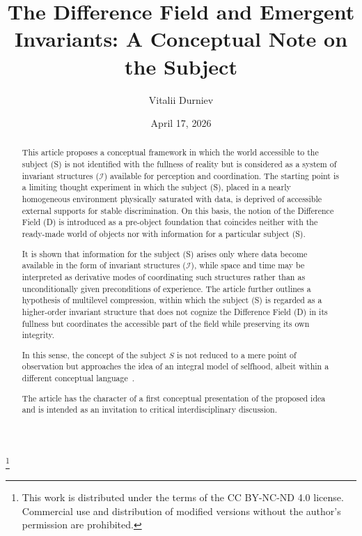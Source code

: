 \documentclass[aps,prd,onecolumn,nofootinbib,superscriptaddress]{revtex4-2} %
\newcommand{\papertitle}{The Difference Field and Emergent Invariants: A Conceptual Note on the Subject}
\newcommand{\paperauthor}{Vitalii Durniev}
\begin{document}
    \title{\papertitle}

    \thanks{This work is distributed under the terms of the CC BY-NC-ND 4.0 license. Commercial use and distribution of modified versions without the author's permission are prohibited.}

    \author{\paperauthor}

    \date{April 17, 2026}

    \begin{abstract}
        This article proposes a conceptual framework in which the world accessible to the subject (S) is not identified with the fullness of reality but is considered as a system of invariant structures ($\mathcal{I}$) available for perception and coordination. The starting point is a limiting thought experiment in which the subject (S), placed in a nearly homogeneous environment physically saturated with data, is deprived of accessible external supports for stable discrimination. On this basis, the notion of the Difference Field (D) is introduced as a pre-object foundation that coincides neither with the ready-made world of objects nor with information for a particular subject (S).

        It is shown that information for the subject (S) arises only where data become available in the form of invariant structures ($\mathcal{I}$), while space and time may be interpreted as derivative modes of coordinating such structures rather than as unconditionally given preconditions of experience. The article further outlines a hypothesis of multilevel compression, within which the subject (S) is regarded as a higher-order invariant structure that does not cognize the Difference Field (D) in its fullness but coordinates the accessible part of the field while preserving its own integrity.

        In this sense, the concept of the subject \(S\) is not reduced to a mere point of observation but approaches the idea of an integral model of selfhood, albeit within a different conceptual language~\cite{Metzinger2003}.

        The article has the character of a first conceptual presentation of the proposed idea and is intended as an invitation to critical interdisciplinary discussion.
    \end{abstract}

    \maketitle
\end{document}
